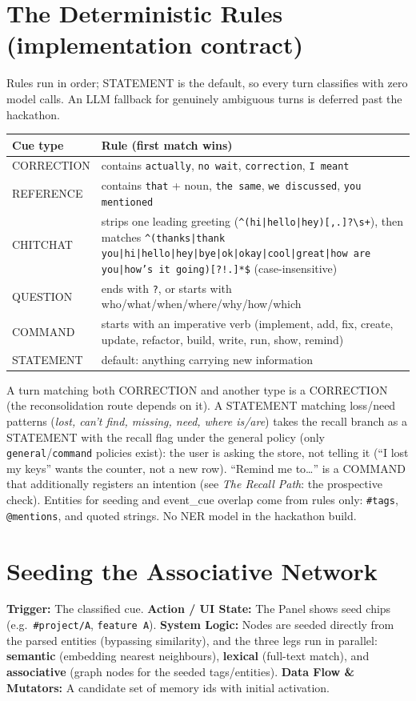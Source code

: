 \section{The Deterministic Rules (implementation contract)}
Rules run in order; STATEMENT is the default, so every turn classifies with zero model calls.
An LLM fallback for genuinely ambiguous turns is deferred past the hackathon.
\begin{longtable}{@{}p{}p{}@{}}
\toprule
Cue type & Rule (first match wins) \\
\midrule
CORRECTION & contains \texttt{actually}, \texttt{no wait}, \texttt{correction}, \texttt{I meant} \\
REFERENCE & contains \texttt{that} + noun, \texttt{the same}, \texttt{we discussed}, \texttt{you mentioned} \\
CHITCHAT & strips one leading greeting (\texttt{\^{}(hi|hello|hey)[,.]?\textbackslash s+}), then matches \texttt{\^{}(thanks|thank you|hi|hello|hey|bye|ok|okay|cool|great|how are you|how's it going)[?!.]*\$} (case-insensitive) \\
QUESTION & ends with \texttt{?}, or starts with who/what/when/where/why/how/which \\
COMMAND & starts with an imperative verb (implement, add, fix, create, update, refactor, build, write, run, show, remind) \\
STATEMENT & default: anything carrying new information \\
\bottomrule
\end{longtable}
A turn matching both CORRECTION and another type is a CORRECTION (the reconsolidation route
depends on it). A STATEMENT matching loss/need patterns (\emph{lost, can't find, missing, need,
where is/are}) takes the recall branch as a STATEMENT with the recall flag under the general
policy (only \texttt{general}/\texttt{command} policies exist): the user is asking the store, not
telling it (``I lost my keys'' wants the counter, not a new row). ``Remind me to\ldots'' is a COMMAND that additionally registers an intention
(see \emph{The Recall Path}: the prospective check). Entities for seeding and event\_cue
overlap come from rules only: \texttt{\#tags}, \texttt{@mentions}, and quoted strings. No NER
model in the hackathon build.

\section{Seeding the Associative Network}
\textbf{Trigger:} The classified cue.
\textbf{Action / UI State:} The Panel shows seed chips (e.g.\ \texttt{\#project/A}, \texttt{feature A}).
\textbf{System Logic:} Nodes are seeded directly from the parsed entities (bypassing similarity), and
the three legs run in parallel: \textbf{semantic} (embedding nearest neighbours), \textbf{lexical}
(full-text match), and \textbf{associative} (graph nodes for the seeded tags/entities).
\textbf{Data Flow \& Mutators:} A candidate set of memory ids with initial activation.


